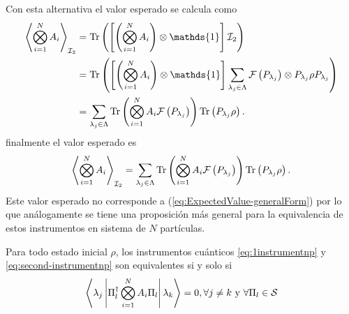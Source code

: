 \documentclass[12pt,oneside]{book}\raggedbottom{}
\begin{document}
Con esta alternativa el valor esperado se calcula como 
\begin{equation*}
    \begin{split}
        \left \la \prodtensor A_i \right \ra_{\mathcal{I}_2}&=\tr\left( \left[\left(\prodtensor A_i\right) \otimes \mathds{1}\right]\mathcal{I}_2\right) \\
        &=\tr\left(\left[ \left(\prodtensor A_i\right)\otimes \mathds{1}\right]\sum_{\lambda_j \in \Lambda}\fuzzy{P_{\lambda_j}}\otimes P_{\lambda_j}{\rho}P_{\lambda_j} \right)\\
        &=\sum_{\lambda_j\in \Lambda} \tr\left(\prodtensor A_i\fuzzy{P_{\lambda_j}}\right) \tr\left(P_{\lambda_j}\rho\right). \\
    \end{split}
\end{equation*} finalmente el valor esperado es \begin{equation}\label{eq:valor-esperado-2instrumentnp}
    \left \langle \bigotimes_{i=1}^{N} A_i \right \rangle_{\mathcal{I}_2}=\sum_{\lambda_j\in \Lambda} {\rm Tr}\left(\bigotimes_{i=1}^{N} A_i\mathcal{F}\left(P_{\lambda_j}\right)\right) {\rm Tr}\left(P_{\lambda_j}\rho\right).
\end{equation} Este valor esperado no corresponde a (\ref{eq:ExpectedValue-generalForm}) por lo que análogamente se tiene una proposición más general para la equivalencia de estos instrumentos en sistema de $N$ partículas.

\begin{proposition}\label{prop:Equivalencia-instrumentos-np}
    Para todo estado inicial $\rho$, los instrumentos cuánticos {\ref{eq:1instrumentnp}} y {\ref{eq:second-instrumentnp}} son equivalentes si y solo si \[\left \langle \lambda_j \left|{\Pi_{l}^{\dagger}\bigotimes_{i=1}^{N} A_i\Pi_{l}}\right|\lambda_k\right\rangle=0,\forall j\ne k \text{ y } \forall \Pi_l \in \mathcal{S}\]
\end{proposition}
\end{document}
